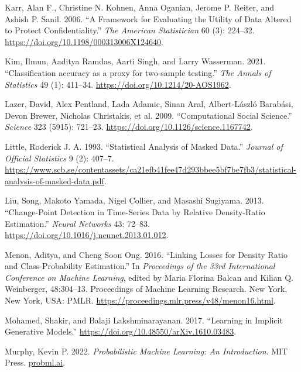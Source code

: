 \documentclass[
]{article}
\newlength{\cslhangindent}
\newlength{\cslentryspacingunit} %
\newenvironment{CSLReferences}[2] %
 {%
  \setlength{\parindent}{0pt}
  \ifodd #1
  \let\oldpar\par
  \def\par{\hangindent=\cslhangindent\oldpar}
  \fi
  \setlength{\parskip}{#2\cslentryspacingunit}
 }%
 {}
\begin{document}
\begin{CSLReferences}{1}{0}
\leavevmode{}%
Karr, Alan F., Christine N. Kohnen, Anna Oganian, Jerome P. Reiter, and
Ashish P. Sanil. 2006. {``A Framework for Evaluating the Utility of Data
Altered to Protect Confidentiality.''} \emph{The American Statistician}
60 (3): 224--32. \url{https://doi.org/10.1198/000313006X124640}.

\leavevmode{}%
Kim, Ilmun, Aaditya Ramdas, Aarti Singh, and Larry Wasserman. 2021.
{``{Classification accuracy as a proxy for two-sample testing}.''}
\emph{The Annals of Statistics} 49 (1): 411--34.
\url{https://doi.org/10.1214/20-AOS1962}.

\leavevmode{}%
Lazer, David, Alex Pentland, Lada Adamic, Sinan Aral, Albert-László
Barabási, Devon Brewer, Nicholas Christakis, et al. 2009.
{``Computational Social Science.''} \emph{Science} 323 (5915): 721--23.
\url{https://doi.org/10.1126/science.1167742}.

\leavevmode{}%
Little, Roderick J. A. 1993. {``Statistical Analysis of Masked Data.''}
\emph{Journal of Official Statistics} 9 (2): 407--7.
\url{https://www.scb.se/contentassets/ca21efb41fee47d293bbee5bf7be7fb3/statistical-analysis-of-masked-data.pdf}.

\leavevmode{}%
Liu, Song, Makoto Yamada, Nigel Collier, and Masashi Sugiyama. 2013.
{``Change-Point Detection in Time-Series Data by Relative Density-Ratio
Estimation.''} \emph{Neural Networks} 43: 72--83.
\url{https://doi.org/10.1016/j.neunet.2013.01.012}.

\leavevmode{}%
Menon, Aditya, and Cheng Soon Ong. 2016. {``Linking Losses for Density
Ratio and Class-Probability Estimation.''} In \emph{Proceedings of the
33rd International Conference on Machine Learning}, edited by Maria
Florina Balcan and Kilian Q. Weinberger, 48:304--13. Proceedings of
Machine Learning Research. New York, New York, USA: PMLR.
\url{https://proceedings.mlr.press/v48/menon16.html}.

\leavevmode{}%
Mohamed, Shakir, and Balaji Lakshminarayanan. 2017. {``Learning in
Implicit Generative Models.''}
\url{https://doi.org/10.48550/arXiv.1610.03483}.

\leavevmode{}%
Murphy, Kevin P. 2022. \emph{Probabilistic Machine Learning: An
Introduction}. MIT Press. \href{https://probml.ai}{probml.ai}.


\end{CSLReferences}
\end{document}
